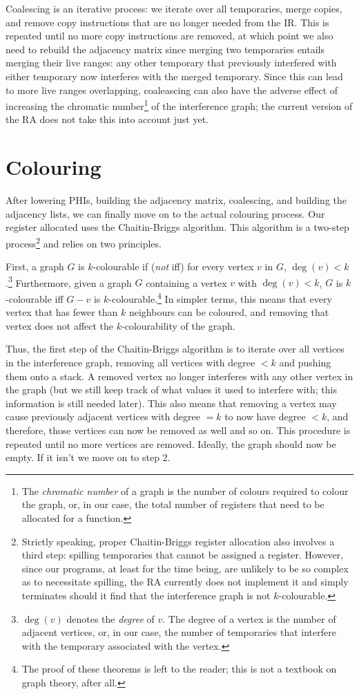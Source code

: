\documentclass[12pt]{report}
\begin{document}
Coalescing is an iterative process: we iterate over all temporaries, merge copies, and remove copy instructions that are no longer needed
from the IR. This is repeated until no more copy instructions are removed, at which point we also need to rebuild the adjacency matrix
since merging two temporaries entails merging their live ranges: any other temporary that previously interfered with either temporary now
interferes with the merged temporary. Since this can lead to more live ranges overlapping, coaleascing can also have the adverse effect
of increasing the chromatic number\footnote{The \textit{chromatic number} of a graph is the number of colours required to colour the graph,
or, in our case, the total number of registers that need to be allocated for a function.} of the interference graph; the current version of
the RA does not take this into account just yet.

\section{Colouring}
After lowering PHIs, building the adjacency matrix, coalescing, and building the adjacency lists, we can finally move on to the actual
colouring process. Our register allocated uses the Chaitin-Briggs algorithm. This algorithm is a two-step process\footnote{Strictly
speaking, proper Chaitin-Briggs register allocation also involves a third step: spilling temporaries that cannot be assigned a register.
However, since our programs, at least for the time being, are unlikely to be so complex as to necessitate spilling, the RA currently does
not implement it and simply terminates should it find that the interference graph is not $k$-colourable.} and relies on two
principles.

First, a graph $G$ is $k$-colourable if (\textit{not} iff) for every vertex $v$ in $G$, $\deg(v) < k$.\footnote{$\deg(v)$ denotes the
\textit{degree} of $v$. The degree of a vertex is the number of adjacent vertices, or, in our case, the number of temporaries that
interfere with the temporary associated with the vertex.} Furthermore, given a graph $G$ containing a vertex $v$ with $\deg(v) < k$,
$G$ is $k$-colourable iff $G - v$ is $k$-colourable.\footnote{The proof of these theorems is left to the reader; this is not a textbook
on graph theory, after all.} In simpler terms, this means that every vertex that has fewer than $k$ neighbours
can be coloured, and removing that vertex does not affect the $k$-colourability of the graph.

Thus, the first step of the Chaitin-Briggs algorithm is to iterate over all vertices in the interference graph, removing all vertices
with degree $< k$ and pushing them onto a stack. A removed vertex no longer interferes with any other vertex in the graph (but we still
keep track of what values it used to interfere with; this information is still needed later). This also means that removing a vertex may
cause previously adjacent vertices with degree $= k$ to now have degree $< k$, and therefore, those vertices can now be removed as well
and so on. This procedure is repeated until no more vertices are removed. Ideally, the graph should now be empty. If it isn't we move on
to step 2.
\end{document}
